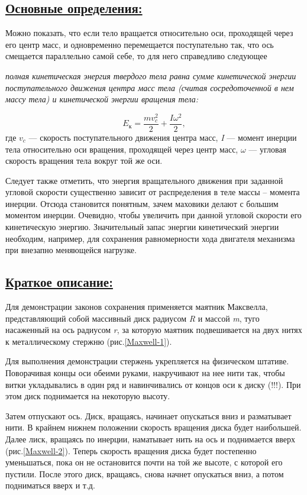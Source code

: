 \documentclass[14pt,a4paper,oneside]{extarticle}	%
\begin{document}
\newpage
\subsection*{\underline{Основные определения:}}
		
Можно показать, что если тело вращается относительно оси, проходящей через его центр масс, и одновременно перемещается поступательно так, что ось смещается параллельно самой себе, то для него справедливо следующее 
\begin{flushleft}
\textit{полная кинетическая энергия твердого тела равна сумме кинетической энергии поступательного движения центра масс тела (считая сосредоточенной в нем массу тела) и кинетической энергии вращения тела:}
\end{flushleft}
$$ E_\text{к} = \frac{mv_c^2}{2} + \frac{I\omega^2}{2}, $$
где $ v_c $ — скорость поступательного движения центра масс, \textit{I} — момент инерции тела относительно оси вращения, проходящей через центр масс, $ \omega $ — угловая скорость вращения тела вокруг той же оси.

Следует также отметить, что энергия вращательного движения при заданной угловой скорости существенно зависит от распределения в теле массы – момента инерции.
Отсюда становится понятным, зачем маховики делают с большим моментом инерции.
Очевидно, чтобы увеличить при данной угловой скорости его кинетическую энергию.
Значительный запас энергии кинетический энергии необходим, например, для сохранения равномерности хода двигателя механизма при внезапно меняющейся нагрузке.
	
\newpage
\subsection*{\underline{Краткое описание:}}


Для демонстрации законов сохранения применяется маятник Максвелла, представляющий собой массивный диск радиусом \textit{R} и массой \textit{m}, туго насаженный на ось радиусом \textit{r}, за которую маятник подвешивается на двух нитях к металлическому стержню (рис.\ref{Maxwell-1}).

Для выполнения демонстрации стержень укрепляется на физическом штативе.
Поворачивая концы оси обеими руками, накручивают на нее нити так, чтобы витки укладывались в один ряд и навинчивались от концов оси к диску (!!!).
При этом диск поднимается на некоторую высоту.

Затем отпускают ось.
Диск, вращаясь, начинает опускаться вниз и разматывает нити.
В крайнем нижнем положении скорость вращения диска будет наибольшей.
Далее лиск, вращаясь по инерции, наматывает нить на ось и поднимается вверх (рис.\ref{Maxwell-2}).
Теперь скорость вращения диска будет постепенно уменьшаться, пока он не остановится почти на той же высоте, с которой его пустили.
После этого диск, вращаясь, снова начнет опускаться вниз, а потом подниматься вверх и т.д.
\end{document}
